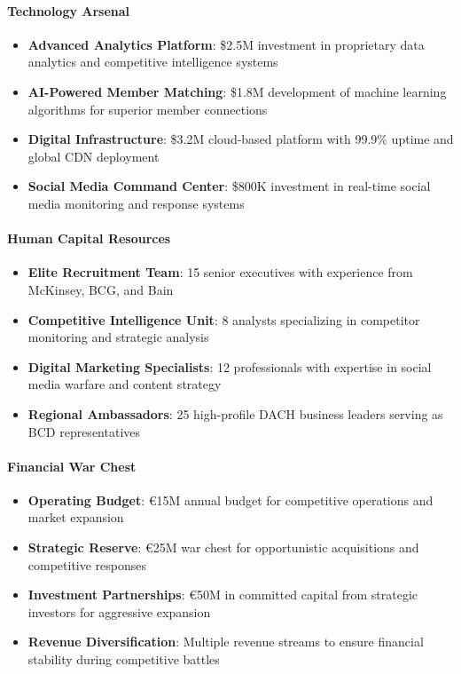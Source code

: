 \paragraph{Technology Arsenal}
\begin{itemize}
    \item \textbf{Advanced Analytics Platform}: \$2.5M investment in proprietary data analytics and competitive intelligence systems
    \item \textbf{AI-Powered Member Matching}: \$1.8M development of machine learning algorithms for superior member connections
    \item \textbf{Digital Infrastructure}: \$3.2M cloud-based platform with 99.9\% uptime and global CDN deployment
    \item \textbf{Social Media Command Center}: \$800K investment in real-time social media monitoring and response systems
\end{itemize}

\paragraph{Human Capital Resources}
\begin{itemize}
    \item \textbf{Elite Recruitment Team}: 15 senior executives with experience from McKinsey, BCG, and Bain
    \item \textbf{Competitive Intelligence Unit}: 8 analysts specializing in competitor monitoring and strategic analysis
    \item \textbf{Digital Marketing Specialists}: 12 professionals with expertise in social media warfare and content strategy
    \item \textbf{Regional Ambassadors}: 25 high-profile DACH business leaders serving as BCD representatives
\end{itemize}

\paragraph{Financial War Chest}
\begin{itemize}
    \item \textbf{Operating Budget}: €15M annual budget for competitive operations and market expansion
    \item \textbf{Strategic Reserve}: €25M war chest for opportunistic acquisitions and competitive responses
    \item \textbf{Investment Partnerships}: €50M in committed capital from strategic investors for aggressive expansion
    \item \textbf{Revenue Diversification}: Multiple revenue streams to ensure financial stability during competitive battles
\end{itemize}

